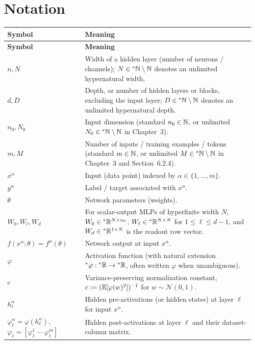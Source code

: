 \chapter*{Notation}

\noindent
\begin{xltabular}{\textwidth}{@{}lX@{}}
\toprule
\textbf{Symbol} & \textbf{Meaning} \\
\midrule
\endfirsthead
\toprule
\textbf{Symbol} & \textbf{Meaning} \\
\midrule
\endhead
\bottomrule
\endfoot
\bottomrule
\endlastfoot
$n, N$ & Width of a hidden layer (number of neurons / channels); $N \in {}^*\mathbb{N} \setminus \mathbb{N}$ denotes an unlimited hypernatural width. \\
$d, D$ & Depth, or number of hidden layers or blocks, excluding the input layer; $D \in {}^*\mathbb{N} \setminus \mathbb{N}$ denotes an unlimited hypernatural depth. \\
$n_0, N_0$ & Input dimension (standard $n_0 \in \mathbb{N}$, or unlimited $N_0 \in {}^*\mathbb{N} \setminus \mathbb{N}$ in Chapter~3). \\
$m, M$ & Number of inputs / training examples / tokens (standard $m \in \mathbb{N}$, or unlimited $M \in {}^*\mathbb{N} \setminus \mathbb{N}$ in Chapter~3 and Section~6.2.4). \\
$x^\alpha$ & Input (data point) indexed by $\alpha \in \{1, \dots, m\}$. \\
$y^\alpha$ & Label / target associated with $x^\alpha$. \\
$\theta$ & Network parameters (weights). \\
$W_0, W_\ell, W_d$ & For scalar-output MLPs of hyperfinite width $N$, $W_0 \in {}^*\mathbb{R}^{N\times n_0}$, $W_\ell \in {}^*\mathbb{R}^{N\times N}$ for $1 \le \ell \le d-1$, and $W_d \in {}^*\mathbb{R}^{1\times N}$ is the readout row vector. \\
$f(x^\alpha; \theta) = f^\alpha(\theta)$ & Network output at input $x^\alpha$. \\
$\varphi$ & Activation function (with natural extension ${}^*\varphi : {}^*\mathbb{R} \to {}^*\mathbb{R}$, often written $\varphi$ when unambiguous). \\
$c$ & Variance-preserving normalization constant, $c := (\mathbb{E}[\varphi(w)^2])^{-1}$ for $w \sim \mathcal{N}(0,1)$. \\
$h_\ell^\alpha$ & Hidden pre-activations (or hidden states) at layer $\ell$ for input $x^\alpha$. \\
$\varphi_\ell^\alpha = \varphi(h_\ell^\alpha)$, $\varphi_\ell = [\varphi_\ell^1 \;\cdots\; \varphi_\ell^m]$ & Hidden post-activations at layer $\ell$ and their dataset-column matrix. \\

\end{xltabular}
